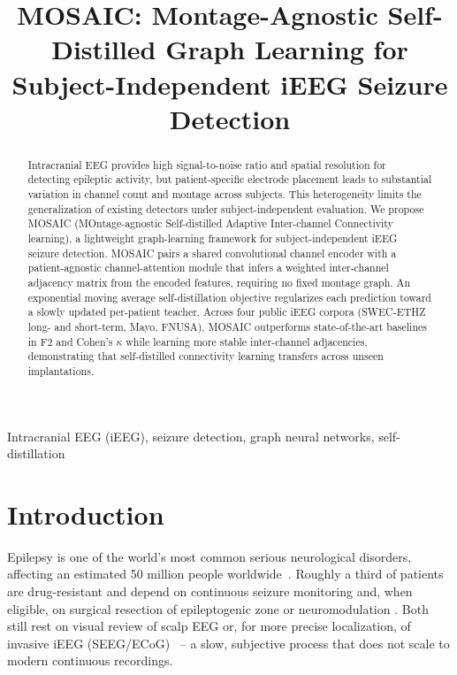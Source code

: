 \documentclass[letterpaper]{article}
\title{MOSAIC: Montage-Agnostic Self-Distilled Graph Learning for Subject-Independent iEEG Seizure Detection}
\begin{document}
\ninept
\maketitle
\begin{abstract}
Intracranial EEG provides high signal-to-noise ratio and spatial resolution for detecting epileptic activity, but patient-specific electrode placement leads to substantial variation in channel count and montage across subjects. This heterogeneity limits the generalization of existing detectors under subject-independent evaluation. We
propose MOSAIC (MOntage-agnostic Self-distilled Adaptive Inter-channel
Connectivity learning), a lightweight graph-learning framework for
subject-independent iEEG seizure detection. MOSAIC pairs a shared
convolutional channel encoder with a patient-agnostic channel-attention module
that infers a weighted inter-channel adjacency matrix from the encoded features,
requiring no fixed montage graph. An exponential moving average
self-distillation objective regularizes each prediction toward a slowly
updated per-patient teacher. Across four public iEEG corpora (SWEC-ETHZ long-
and short-term, Mayo, FNUSA), MOSAIC outperforms state-of-the-art baselines in
F2 and Cohen's $\kappa$ while learning more stable inter-channel
adjacencies, demonstrating that self-distilled connectivity 
learning transfers across unseen implantations.
\end{abstract}
\begin{keywords}
Intracranial EEG (iEEG), seizure detection, graph neural networks,
self-distillation
\end{keywords}
\section{Introduction}
\label{sec:intro}

Epilepsy is one of the world's most common serious neurological
disorders, affecting an estimated 50 million people
worldwide~\cite{who2024epilepsy}. Roughly a third of patients are
drug-resistant and depend on continuous seizure monitoring and, when
eligible, on surgical resection of  epileptogenic zone or neuromodulation \cite{shin2022neuraltree}. Both still
rest on visual review of scalp EEG or, for more precise localization, of
invasive iEEG (SEEG/ECoG)~\cite{flanary2023reliability} -- a slow,
subjective process that does not scale to modern continuous recordings.
\end{document}
